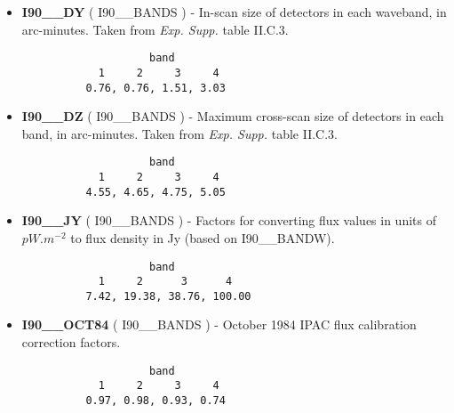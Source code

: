 \begin{itemize}
\begin{minipage}[t]{\textwidth}
\begin{verbatim}
\end{verbatim}
\normalsize
\end{minipage}

\item {\bf I90\_\_DY} ( I90\_\_BANDS ) -     In-scan size of detectors in each waveband, in
arc-minutes. Taken from {\em Exp. Supp.} table II.C.3.

\begin{minipage}[t]{\textwidth}
\small
\begin{verbatim}
                    band
            1     2     3     4
          0.76, 0.76, 1.51, 3.03
\end{verbatim}
\normalsize
\end{minipage}

\item {\bf I90\_\_DZ} ( I90\_\_BANDS ) -     Maximum cross-scan size of detectors in each
band, in arc-minutes. Taken from {\em Exp. Supp.} table II.C.3.

\begin{minipage}[t]{\textwidth}
\small
\begin{verbatim}
                    band
            1     2     3     4
          4.55, 4.65, 4.75, 5.05
\end{verbatim}
\normalsize
\end{minipage}

\item {\bf I90\_\_JY} ( I90\_\_BANDS ) -     Factors for converting flux values in units
of $pW.m^{-2}$ to flux density in Jy (based on I90\_\_BANDW).

\begin{minipage}[t]{\textwidth}
\small
\begin{verbatim}
                    band
            1     2      3      4
          7.42, 19.38, 38.76, 100.00
\end{verbatim}
\normalsize
\end{minipage}

\item {\bf I90\_\_OCT84} ( I90\_\_BANDS ) -  October 1984 IPAC flux calibration correction
factors.

\begin{minipage}[t]{\textwidth}
\small
\begin{verbatim}
                    band
            1     2     3     4
          0.97, 0.98, 0.93, 0.74
\end{verbatim}
\normalsize
\end{minipage}


\end{itemize}
